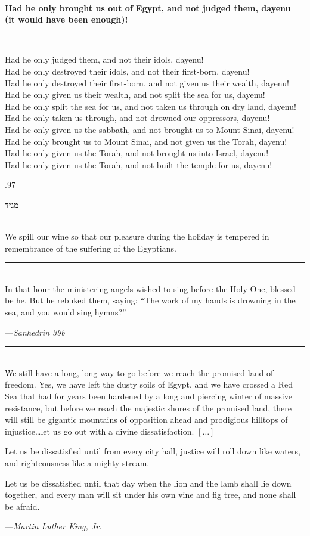 \documentclass[letter,11pt,openany]{memoir}
\newcommand{\HgEllipsis}{\ensuremath{\left[\ldots\right]}}
\newcommand{\HgSource}[1]{\hfill{\small---\itshape{#1}}}
\newcommand{\hchapter}[1]{ 
\begin{hebrew}
	\begin{Spacing}
		{.97} 
		\newpage \strut
		
		\vspace{.15em}
		\begin{flushleft}
			\noindent\Huge #1 
		\end{flushleft}
		
		\vspace{1em} 
	\end{Spacing}
\end{hebrew}

}
\newcommand{\HgHL}[1]{{\Large\textbf{#1}\par
\noindent\\[-.5em]}}
\newcommand{\HgFill}{
\vfill \hrule 
\vfill}
\newenvironment{HgEnglish}{\strut\\
\noindent}{\vspace{1em}}
\begin{document}
\begin{HgEnglish}
	\HgHL{ Had he only brought us out of Egypt, and not judged them, dayenu \\
	(it would have been enough)!} Had he only judged them, and not their idols, dayenu!\\
	Had he only destroyed their idols, and not their first-born, dayenu!\\
	Had he only destroyed their first-born, and not given us their wealth, dayenu!\\
	Had he only given us their wealth, and not split the sea for us, dayenu!\\
	Had he only split the sea for us, and not taken us through on dry land, dayenu!\\
	Had he only taken us through, and not drowned our oppressors, dayenu!\\
	
	Had he only given us the sabbath, and not brought us to Mount Sinai, dayenu!\\
	Had he only brought us to Mount Sinai, and not given us the Torah, dayenu!\\
	Had he only given us the Torah, and not brought us into Israel, dayenu!\\
	Had he only given us the Torah, and not built the temple for us, dayenu! 
\end{HgEnglish}

\vfill

\hchapter{מגיד}
\begin{HgEnglish}
	We spill our wine so that our pleasure during the holiday is tempered in remembrance of the suffering of the Egyptians. 
\end{HgEnglish}

\HgFill
\begin{HgEnglish}
	In that hour the ministering angels wished to sing before the Holy One, blessed be he. But he rebuked them, saying: ``The work of my hands is drowning in the sea, and you would sing hymns?''
	
	\HgSource{Sanhedrin 39b} 
\end{HgEnglish}

\HgFill
\begin{HgEnglish}
	We still have a long, long way to go before we reach the promised land of freedom. Yes, we have left the dusty soils of Egypt, and we have crossed a Red Sea that had for years been hardened by a long and piercing winter of massive resistance, but before we reach the majestic shores of the promised land, there will still be gigantic mountains of opposition ahead and prodigious hilltops of injustice\ldots{}let us go out with a divine dissatisfaction. \HgEllipsis
	
	Let us be dissatisfied until from every city hall, justice will roll down like waters, and righteousness like a mighty stream.
	
	Let us be dissatisfied until that day when the lion and the lamb shall lie down together, and every man will sit under his own vine and fig tree, and none shall be afraid.
	
	\HgSource{Martin Luther King, Jr.} 
\end{HgEnglish}
\end{document}
